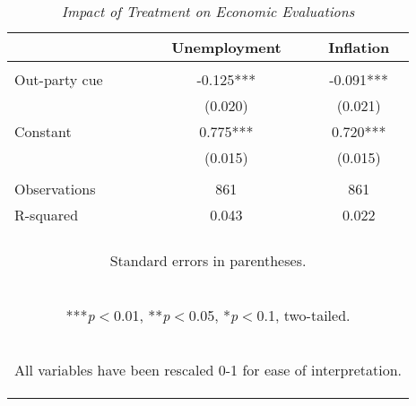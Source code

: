 \begin{table}[h]
\caption{\textit{Impact of Treatment on Economic Evaluations}\label{tab:tab_3}}
\begin{center}
\begin{tabular}{lcc} \hline
 & Unemployment & Inflation \\ \hline
 &  &  \\
Out-party cue & -0.125*** & -0.091*** \\
 & (0.020) & (0.021) \\
Constant & 0.775*** & 0.720*** \\
 & (0.015) & (0.015) \\
 &  &  \\
Observations & 861 & 861 \\
 R-squared & 0.043 & 0.022 \\ \hline
  & & \\
\multicolumn{3}{c}{\begin{footnotesize} Standard errors in parentheses. \end{footnotesize}} \\
\multicolumn{3}{c}{\begin{footnotesize} ***\textit{p}$<$0.01, **\textit{p}$<$0.05, *\textit{p}$<$0.1, two-tailed. \end{footnotesize}} \\
\multicolumn{3}{c}{\begin{footnotesize} All variables have been rescaled 0-1 for ease of interpretation.\end{footnotesize}} \\
\end{tabular}
\end{center}
\end{table}

